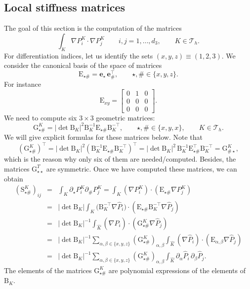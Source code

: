 \documentclass[10pt,english]{article}
\begin{document}
\subsection{Local stiffness matrices}

The goal of this section is the computation of the matrices
\[
\int_K \nabla P_i^K\cdot\nabla P_j^K \qquad i,j=1,\ldots,d_3, \qquad K\in \mathcal T_h.
\]	
For differentiation indices, let us identify the sets $(x,y,z)\equiv (1,2,3).$
We consider the canonical basis of the space of matrices
\[
\mathrm E_{\star\#}=\mathbf e_\star\, \mathbf e_\#^\top, \qquad \star,\#\in \{x,y,z\}.
\]
For instance
\[
\mathrm E_{xy} =\left[\begin{array}{ccc} 0 & 1 & 0 \\ 0 & 0 & 0 \\ 0
& 0 & 0 \end{array}\right].
\]
We need to compute six $3\times 3$ geometric matrices:
\[
\mathrm G_{\star\#}^K = |\det \mathrm B_K|^2 \mathrm B_K^{-1}\mathrm
E_{\star\#} \mathrm B_K^{-\top}, \qquad \star,\#\in \{x,y,x\}, \qquad K\in \mathcal T_h.
\]
We will give explicit formulas for these matrices below. Note
that
\[
(\mathrm G_{\star\#}^K)^\top= |\det \mathrm B_K|^2 (\mathrm B_K^{-1}\mathrm
E_{\star\#} \mathrm B_K^{-\top})^\top=
|\det \mathrm B_K|^2 \,\mathrm B_K^{-1}\mathrm
E_{\star\#}^\top \mathrm B_K^{-\top}= \mathrm G_{\#\star}^K,
\]
which is the reason why only six of them are needed/computed. Besides, the matrices $\mathrm G_{\star\star}^T$
are symmetric. Once we have computed these matrices, we can obtain
\begin{eqnarray*}
(\mathrm S_{\star\#}^K)_{ij} &=& \int_K \partial_\star P_i^K
\partial_\# P_j^K = \int_K (\nabla P_i^K)\cdot( \mathrm E_{\star\#}
\nabla P_j^K)\\
&=& |\det\mathrm B_K| \int_{\widehat K} \big( \mathrm B_K^{-\top}
\nabla \widehat P_i)\cdot ( \mathrm E_{\star\#} \mathrm
B_K^{-\top}\nabla\widehat P_j)\\
&=& |\det\mathrm B_K|^{-1} \int_{\widehat K} (\nabla \widehat
P_i)\cdot (\mathrm G_{\star\#}^K \nabla \widehat P_j)\\
&=& |\det\mathrm B_K|^{-1} \sum_{\alpha,\beta\in \{x,y,z\}} (\mathrm
G_{\star\#}^K)_{\alpha,\beta} \int_{\widehat K} (\nabla \widehat
P_i)\cdot (\mathrm E_{\alpha,\beta} \nabla \widehat P_j)\\
&=& |\det\mathrm B_K|^{-1} \sum_{\alpha,\beta\in \{x,y,z\}} (\mathrm
G_{\star\#}^K)_{\alpha,\beta} \int_{\widehat K}\partial_\alpha\widehat P_i\,\partial_\beta \widehat P_j.
\end{eqnarray*}
The elements of the matrices $\mathrm G_{\star\#}^K$ are polynomial expressions of the
elements of $\mathrm B_K$.
\end{document}
